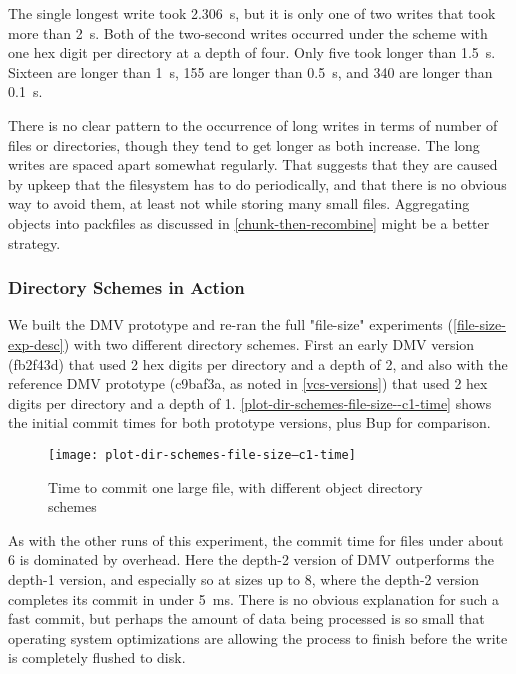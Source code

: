 
The single longest write took \SI{2.306}{\s}, but it is only one of two writes
that took more than \SI{2}{\s}. Both of the two-second writes occurred under the
scheme with one hex digit per directory at a depth of four. Only five took
longer than \SI{1.5}{\s}. Sixteen are longer than \SI{1}{\s}, \num{155} are
longer than \SI{0.5}{\s}, and \num{340} are longer than \SI{0.1}{\s}.

There is no clear pattern to the occurrence of long writes in terms of number of
files or directories, though they tend to get longer as both increase. The long
writes are spaced apart somewhat regularly. That suggests that they are caused
by upkeep that the filesystem has to do periodically, and that there is no
obvious way to avoid them, at least not while storing many small files.
Aggregating objects into \glspl{packfile} as discussed in
\autoref{chunk-then-recombine} might be a better strategy.


\subsubsection{Directory Schemes in Action}

We built the DMV prototype and re-ran the full "file-size" experiments
(\autoref{file-size-exp-desc}) with two different directory schemes. First an
early DMV version (fb2f43d) that used \num{2} hex digits per directory and a
depth of \num{2}, and also with the reference DMV prototype (c9baf3a, as noted
in \autoref{vcs-versions}) that used \num{2} hex digits per directory and a
depth of \num{1}. \autoref{plot-dir-schemes-file-size--c1-time} shows the
initial commit times for both prototype versions, plus Bup for comparison.

\begin{figure}
    \caption{Time to commit one large file, with different object directory
    schemes}
    \label{plot-dir-schemes-file-size--c1-time}
    \centering

    \explainlogsubfig

    \texttt{[image: plot-dir-schemes-file-size--c1-time]}
\end{figure}

As with the other runs of this experiment, the commit time for files under about
\SI{6}{\mib} is dominated by overhead. Here the depth-\num{2} version of DMV
outperforms the depth-\num{1} version, and especially so at sizes up to
\SI{8}{\kib}, where the depth-\num{2} version completes its commit in under
\SI{5}{\ms}. There is no obvious explanation for such a fast commit, but perhaps
the amount of data being processed is so small that operating system
optimizations are allowing the process to finish before the write is completely
flushed to disk.

